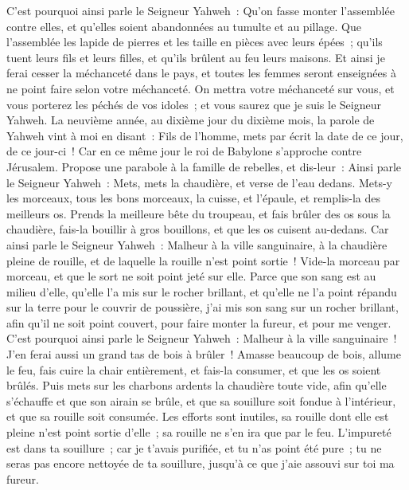 \begin{multicols}{2}
C'est pourquoi ainsi parle le Seigneur Yahweh~: Qu'on fasse monter l'assemblée contre elles, et qu'elles soient abandonnées au tumulte et au pillage.
Que l'assemblée les lapide de pierres et les taille en pièces avec leurs épées~; qu'ils tuent leurs fils et leurs filles, et qu'ils brûlent au feu leurs maisons.
Et ainsi je ferai cesser la méchanceté dans le pays, et toutes les femmes seront enseignées à ne point faire selon votre méchanceté.
On mettra votre méchanceté sur vous, et vous porterez les péchés de vos idoles~; et vous saurez que je suis le Seigneur Yahweh.
\VerseOne{}La neuvième année, au dixième jour du dixième mois, la parole de Yahweh vint à moi en disant~:
Fils de l'homme, mets par écrit la date de ce jour, de ce jour-ci~! Car en ce même jour le roi de Babylone s'approche contre Jérusalem.
Propose une parabole à la famille de rebelles, et dis-leur~: Ainsi parle le Seigneur Yahweh~: Mets, mets la chaudière, et verse de l'eau dedans.
Mets-y les morceaux, tous les bons morceaux, la cuisse, et l'épaule, et remplis-la des meilleurs os.
Prends la meilleure bête du troupeau, et fais brûler des os sous la chaudière, fais-la bouillir à gros bouillons, et que les os cuisent au-dedans.
Car ainsi parle le Seigneur Yahweh~: Malheur à la ville sanguinaire, à la chaudière pleine de rouille, et de laquelle la rouille n'est point sortie~! Vide-la morceau par morceau, et que le sort ne soit point jeté sur elle.
Parce que son sang est au milieu d'elle, qu'elle l'a mis sur le rocher brillant, et qu'elle ne l'a point répandu sur la terre pour le couvrir de poussière,
j'ai mis son sang sur un rocher brillant, afin qu'il ne soit point couvert, pour faire monter la fureur, et pour me venger.
C'est pourquoi ainsi parle le Seigneur Yahweh~: Malheur à la ville sanguinaire~! J'en ferai aussi un grand tas de bois à brûler~!
Amasse beaucoup de bois, allume le feu, fais cuire la chair entièrement, et fais-la consumer, et que les os soient brûlés.
Puis mets sur les charbons ardents la chaudière toute vide, afin qu'elle s'échauffe et que son airain se brûle, et que sa souillure soit fondue à l'intérieur, et que sa rouille soit consumée.
Les efforts sont inutiles, sa rouille dont elle est pleine n'est point sortie d'elle~; sa rouille ne s'en ira que par le feu.
L'impureté est dans ta souillure~; car je t'avais purifiée, et tu n'as point été pure~; tu ne seras pas encore nettoyée de ta souillure, jusqu'à ce que j'aie assouvi sur toi ma fureur.

\end{multicols}
